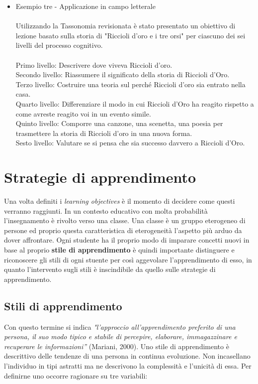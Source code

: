 \begin{itemize}
\item Esempio tre - Applicazione in campo letterale\\
\\
Utilizzando la Tassonomia revisionata è stato presentato un obiettivo di lezione basato sulla storia di "Riccioli d'oro e i tre orsi" per ciascuno dei sei livelli del processo cognitivo.\\
\\
Primo livello: Descrivere dove viveva Riccioli d'oro.\\
Secondo livello: Riassumere il significato della storia di Riccioli d'Oro.\\
Terzo livello: Costruire una teoria sul perché Riccioli d'oro sia entrato nella casa.\\
Quarto livello: Differenziare il modo in cui Riccioli d'Oro ha reagito rispetto a come avreste reagito voi in un evento simile.\\
Quinto livello: Comporre una canzone, una scenetta, una poesia per trasmettere la storia di Riccioli d'oro in una nuova forma.\\
Sesto livello: Valutare se si pensa che sia successo davvero a Riccioli d'Oro.
\end{itemize}
\section{Strategie di apprendimento}
\label{sec:problem}

Una volta definiti i \textit{learning objectives} è il momento di decidere come questi verranno raggiunti. In un contesto educativo con molta probabilità l'insegnamento è rivolto verso una classe. Una classe è un gruppo eterogeneo di persone ed proprio questa caratteristica di eterogeneità l'aspetto più arduo da dover affrontare. Ogni studente ha il proprio modo di imparare concetti nuovi in base al proprio \textbf{stile di apprendimento} è quindi importante distinguere e riconoscere gli stili di ogni stuente per così aggevolare l'apprendimento di esso, in quanto l'intervento sugli stili è inscindibile da quello sulle strategie di apprendimento.

\subsection{Stili di apprendimento}
Con questo termine si indica \textit{"l'approccio all’apprendimento preferito di una persona, il suo modo tipico e stabile di percepire, elaborare, immagazzinare e recuperare le informazioni”} (Mariani, 2000).
Uno stile di apprendimento è descrittivo delle tendenze di una persona in continua evoluzione. Non incasellano l'individuo in tipi astratti ma ne descrivono la complessità e l'unicità di essa. Per definirne uno occorre ragionare su tre variabili:

